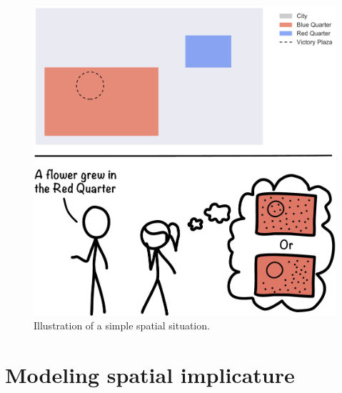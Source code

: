 \documentclass[10pt,letterpaper]{article}
\newcommand{\ndg}[1]{\textcolor{Green}{[ndg: #1]}}
\begin{document}

\begin{figure}[h]
\center
\includegraphics[width=.5\textwidth]{figures/illustration2.pdf}
\caption{Illustration of a simple spatial situation.}
\label{illustration}
\end{figure}



\section{Modeling spatial implicature}\label{mod}
\end{document}
